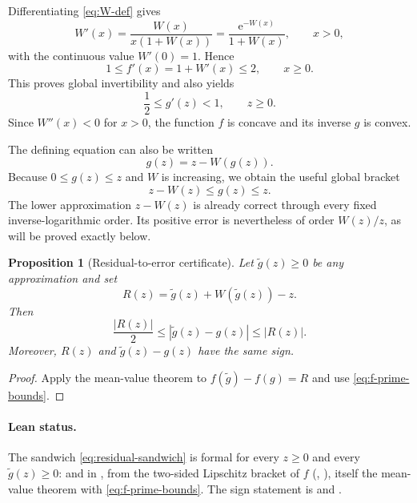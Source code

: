 \documentclass[11pt,a4paper]{article}
\numberwithin{equation}{section}
\newtheorem{proposition}[theorem]{Proposition}
\theoremstyle{definition}
\theoremstyle{remark}
\newcommand{\e}{\mathrm e}
\begin{document}
Differentiating \eqref{eq:W-def} gives
\begin{equation}\label{eq:W-prime}
 W'(x)=\frac{W(x)}{x(1+W(x))}
      =\frac{\e^{-W(x)}}{1+W(x)},
 \qquad x>0,
\end{equation}
with the continuous value \(W'(0)=1\).  Hence
\begin{equation}\label{eq:f-prime-bounds}
  1\le f'(x)=1+W'(x)\le2,
  \qquad x\ge0.
\end{equation}
This proves global invertibility and also yields
\begin{equation}\label{eq:g-prime-bounds}
  \frac12\le g'(z)<1,
  \qquad z\ge0.
\end{equation}
Since \(W''(x)<0\) for \(x>0\), the function \(f\) is concave and its
inverse \(g\) is convex.

The defining equation can also be written
\begin{equation}\label{eq:g-fixedpoint}
  g(z)=z-W(g(z)).
\end{equation}
Because \(0\le g(z)\le z\) and \(W\) is increasing, we obtain the useful
global bracket
\begin{equation}\label{eq:global-bracket}
  z-W(z)\le g(z)\le z.
\end{equation}
The lower approximation \(z-W(z)\) is already correct through every fixed
inverse-logarithmic order.  Its positive error is nevertheless of order
\(W(z)/z\), as will be proved exactly below.

\begin{proposition}[Residual-to-error certificate]\label{prop:residual-certificate}
Let \(\widetilde g(z)\ge0\) be any approximation and set
\begin{equation}\label{eq:residual-def}
  R(z)=\widetilde g(z)+W(\widetilde g(z))-z.
\end{equation}
Then
\begin{equation}\label{eq:residual-sandwich}
  \frac{|R(z)|}{2}\le |\widetilde g(z)-g(z)|\le |R(z)|.
\end{equation}
Moreover, \(R(z)\) and \(\widetilde g(z)-g(z)\) have the same sign.
\end{proposition}

\begin{proof}
Apply the mean-value theorem to \(f(\widetilde g)-f(g)=R\) and use
\eqref{eq:f-prime-bounds}.
\end{proof}

\paragraph{Lean status.}
The sandwich \eqref{eq:residual-sandwich} is formal for every \(z\ge0\) and every
\(\widetilde g(z)\ge0\):  and
 in
, from the two-sided Lipschitz bracket of \(f\)
(, ),
itself the mean-value theorem with \eqref{eq:f-prime-bounds}.  The sign statement is
 and .
\end{document}
